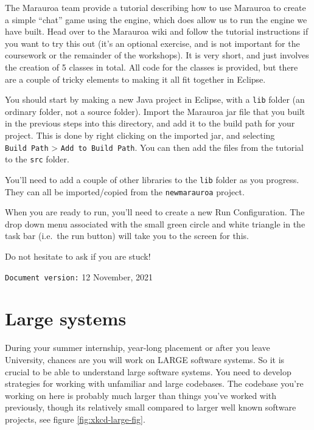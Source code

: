 \documentclass[
]{book}
\begin{document}
The Marauroa team provide a tutorial describing how to use Marauroa to create a simple ``chat'' game using the engine, which does allow us to run the engine we have built. Head over to the Marauroa wiki and follow the tutorial instructions if you want to try this out (it's an optional exercise, and is not important for the coursework or the remainder of the workshops). It is very short, and just involves the creation of 5 classes in total. All code for the classes is provided, but there are a couple of tricky elements to making it all fit together in Eclipse.

You should start by making a new Java project in Eclipse, with a \texttt{lib} folder (an ordinary folder, not a source folder). Import the Marauroa jar file that you built in the previous steps into this directory, and add it to the build path for your project. This is done by right clicking on the imported jar, and selecting \texttt{Build\ Path} \textgreater{} \texttt{Add\ to\ Build\ Path}. You can then add the files from the tutorial to the \texttt{src} folder.

You'll need to add a couple of other libraries to the \texttt{lib} folder as you progress. They can all be imported/copied from the \texttt{newmarauroa} project.

When you are ready to run, you'll need to create a new Run Configuration. The drop down menu associated with the small green circle and white triangle in the task bar (i.e.~the run button) will take you to the screen for this.

Do not hesitate to ask if you are stuck!

\texttt{Document\ version:} 12 November, 2021

\hypertarget{understanding}{%
\chapter{Large systems}\label{understanding}}

During your summer internship, year-long placement or after you leave University, chances are you will work on LARGE software systems. So it is crucial to be able to understand large software systems. You need to develop strategies for working with unfamiliar and large codebases. The codebase you're working on here is probably much larger than things you've worked with previously, though its relatively small compared to larger well known software projects, see figure \ref{fig:xkcd-large-fig}.
\end{document}
